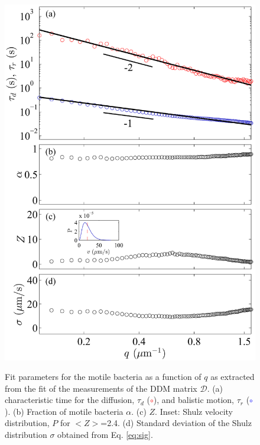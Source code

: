 \documentclass[prb,twocolumn,amsmath,amssymb]{revtex4-1}
\newlength \figwidth
\begin{document}
\begin{figure}
	\includegraphics[width=\figwidth]{VitesseDiffusionParams2.pdf}\\
	\caption{Fit parameters for the motile bacteria as a function of $q$  as extracted from the fit of the measurements of the DDM matrix $\mathcal{D}$. (a) characteristic time for the diffusion, $\tau_d$ (\textcolor{red}{$\circ$}), and balistic motion, $\tau_r$ (\textcolor{blue}{$\circ$}). (b) Fraction of motile bacteria $\alpha$. (c) $Z$. Inset: Shulz velocity distribution, $P$ for $<Z>$=2.4. (d) Standard deviation of the Shulz distribution $\sigma$ obtained from Eq. \eqref{eq:sig}.}
	\label{fig:FitParametersBacteria}
\end{figure}
\end{document}
